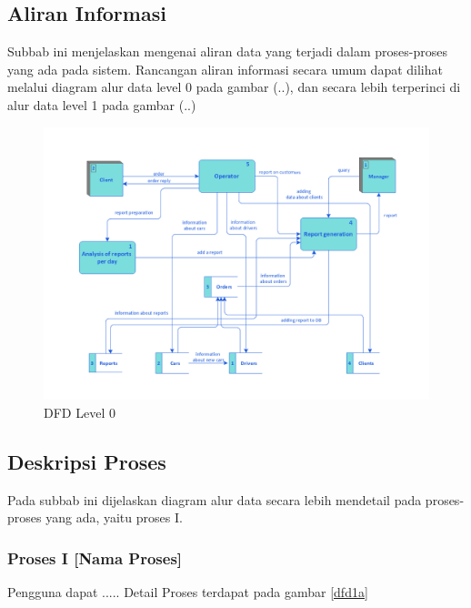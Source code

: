 

  \subsection{Aliran Informasi}
  Subbab ini menjelaskan mengenai aliran data yang terjadi dalam proses-proses yang ada pada sistem. Rancangan aliran informasi secara umum dapat dilihat melalui diagram alur data level 0 pada gambar (..), dan secara lebih terperinci di alur data level 1 pada gambar (..)
      \begin{figure}[H]
        \centering
        \includegraphics[width=1.0\columnwidth]{images/bab3/Taxi-service-dfd.png}
        \caption{DFD Level 0}
        \label{DFD0}
      \end{figure}
      
  \subsection{Deskripsi Proses}
  
  Pada subbab ini dijelaskan diagram alur data secara lebih mendetail pada proses-proses yang ada, yaitu proses I.
  
  \subsubsection{Proses I [Nama Proses]}
  Pengguna dapat ..... Detail Proses terdapat pada gambar \ref{dfd1a} 
  
